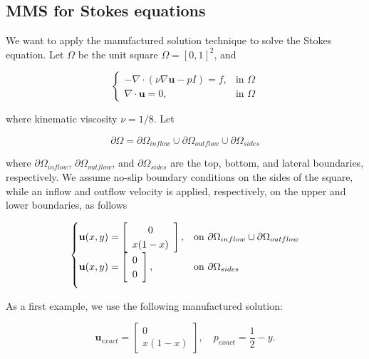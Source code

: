 \documentclass[11pt,a4paper,titlepage]{report}
\begin{document}
\subsection{MMS for Stokes equations}

We want to apply the manufactured solution technique to solve the Stokes equation. Let $\Omega$ be the unit square $\Omega = [0,1]^2$, and

\vspace{0.2cm}
\[
\begin{cases}
- \nabla \cdot (\nu \nabla \mathbf{u} - pI) = f, & \mbox{in } \Omega \\
\nabla \cdot \mathbf{u} = 0, & \mbox{in } \Omega
\end{cases}
\]
\vspace{0.2cm}

where kinematic viscosity $\nu = 1/8$. Let

\[
\partial \Omega = \partial \Omega_{inflow} \cup \partial \Omega_{outflow} \cup \partial \Omega_{sides}
\]

where $\partial \Omega_{inflow}$, $\partial \Omega_{outflow}$, and $\partial \Omega_{sides}$ are the top, bottom, and lateral boundaries, respectively. We assume no-slip boundary conditions on the sides of the square, while an inflow and outflow velocity is applied, respectively, on the upper and lower boundaries, as follows

\[
\begin{cases}
\mathbf{u}(x,y) = \left[ \begin{array}{c} 0 \\ x(1-x) \end{array} \right] , & \mbox{on } \partial \Omega_{inflow} \cup \partial \Omega_{outflow} \\

\vspace{.2cm}

\mathbf{u}(x,y) = \left[ \begin{array}{c} 0 \\ 0 \end{array} \right], & \mbox{on } \partial \Omega_{sides}
\end{cases}
\]

As a first example, we use the following manufactured solution:

\[
\mathbf{u}_{exact} = \left[ \begin{array}{c} 0 \\ x(1-x) \end{array} \right], \quad
p_{exact} = \frac{1}{2}-y.
\]
\end{document}
